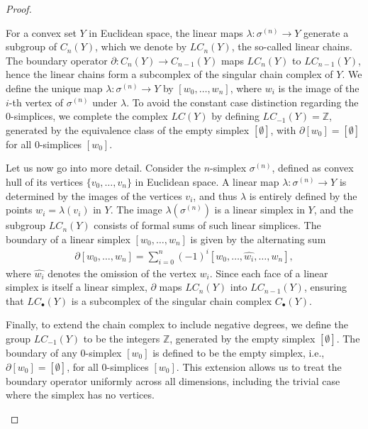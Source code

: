 \begin{proof}
\begin{enumerate}
	For a convex set \(Y\) in Euclidean space, the linear maps \(\lambda: \sigma^{(n)} \rightarrow Y\) generate a subgroup of \(C_n(Y)\), which we denote by \(LC_n(Y)\), the so-called linear chains. The boundary operator \(\partial: C_n(Y) \rightarrow C_{n-1}(Y)\) maps \(LC_n(Y)\) to \(LC_{n-1}(Y)\), hence the linear chains form a subcomplex of the singular chain complex of \(Y\). We define the unique map \(\lambda: \sigma^{(n)} \rightarrow Y\) by \([w_0, \ldots, w_n]\), where \(w_i\) is the image of the \(i\)-th vertex of \(\sigma^{(n)}\) under \(\lambda\). To avoid the constant case distinction regarding the \(0\)-simplices, we complete the complex \(LC(Y)\) by defining \(LC_{-1}(Y) = \mathbb{Z}\), generated by the equivalence class of the empty simplex \([\emptyset]\), with \(\partial[w_0] = [\emptyset]\) for all \(0\)-simplices \([w_0]\).

	Let us now go into more detail. Consider the \(n\)-simplex \(\sigma^{(n)}\), defined as convex hull of its vertices \(\{v_0, \ldots, v_n\}\) in Euclidean space. A linear map \(\lambda: \sigma^{(n)} \rightarrow Y\) is determined by the images of the vertices \(v_i\), and thus \(\lambda\) is entirely defined by the points \(w_i = \lambda(v_i)\) in \(Y\). The image \(\lambda(\sigma^{(n)})\) is a linear simplex in \(Y\), and the subgroup \(LC_n(Y)\) consists of formal sums of such linear simplices. The boundary of a linear simplex \([w_0, \ldots, w_n]\) is given by the alternating sum
	\begin{align}
		\partial[w_0, \ldots, w_n] = \sum_{i=0}^n (-1)^i [w_0, \ldots, \hat{w_i}, \ldots, w_n], 
	\end{align}
	where \(\hat{w_i}\) denotes the omission of the vertex \(w_i\). Since each face of a linear simplex is itself a linear simplex, \(\partial\) maps \(LC_n(Y)\) into \(LC_{n-1}(Y)\), ensuring that \(LC_\bullet(Y)\) is a subcomplex of the singular chain complex \(C_\bullet(Y)\).
			
	Finally, to extend the chain complex to include negative degrees, we define the group \(LC_{-1}(Y)\) to be the integers \(\mathbb{Z}\), generated by the empty simplex \([\emptyset]\). The boundary of any \(0\)-simplex \([w_0]\) is defined to be the empty simplex, i.e., $\partial[w_0] = [\emptyset]$, for all \(0\)-simplices \([w_0]\). This extension allows us to treat the boundary operator uniformly across all dimensions, including the trivial case where the simplex has no vertices.
			

\end{enumerate}
\end{proof}
